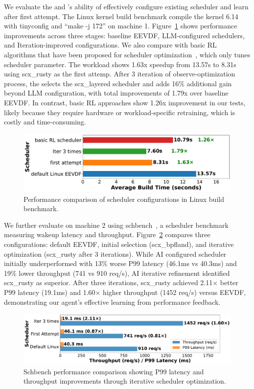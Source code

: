 We evaluate the \sys and \agent's ability of effectively configure existing scheduler and learn after first attempt. The Linux kernel build benchmark compile the kernel 6.14 with tinyconfig and ``make -j 172'' on machine 1. Figure~\ref{fig:performance-comparison} shows performance improvements across three stages: baseline EEVDF, LLM-configured schedulers, and Iteration-improved configurations. We also compare with basic RL algorithms that have been proposed for scheduler optimization~\cite{corbet2025ml}, which only tunes scheduler parameter. The workload shows 1.63x speedup from 13.57s to 8.31s using scx\_rusty as the first attemp. After 3 iteration of observe-optimization process, the \agent selects the scx\_layered scheduler and adds 16\% additional gain beyond LLM configuration, with total improvements of 1.79x over baseline EEVDF. In contrast, basic RL approaches show 1.26x improvement in our tests, likely because they require hardware or workload-specific retraining, which is costly and time-consuming.

\begin{figure}[h]
\centering
\includegraphics[width=0.9\columnwidth]{sections/Linux_build_benchmark_results.pdf}
\caption{Performance comparison of scheduler configurations in Linux build benchmark.}
\label{fig:performance-comparison}
\end{figure}

We further evaluate \sys on machine 2 using schbench~\cite{schbench2016}, a scheduler benchmark measuring wakeup latency and throughput. Figure~\ref{fig:schbench-comparison} compares three configurations: default EEVDF, initial selection (scx\_bpfland), and iterative optimization (scx\_rusty after 3 iterations). While AI configured scheduler initially underperformed with 13\% worse P99 latency (46.1ms vs 40.3ms) and 19\% lower throughput (741 vs 910 req/s), AI iterative refinement identified scx\_rusty as superior. After three iterations, scx\_rusty achieved 2.11× better P99 latency (19.1ms) and 1.60× higher throughput (1452 req/s) versus EEVDF, demonstrating our agent's effective learning from performance feedback.

\begin{figure}[h]
\centering
\includegraphics[width=0.9\columnwidth]{sections/schbench_performance_comparison.pdf}
\caption{Schbench performance comparison showing P99 latency and throughput improvements through iterative scheduler optimization.}
\label{fig:schbench-comparison}
\end{figure}

